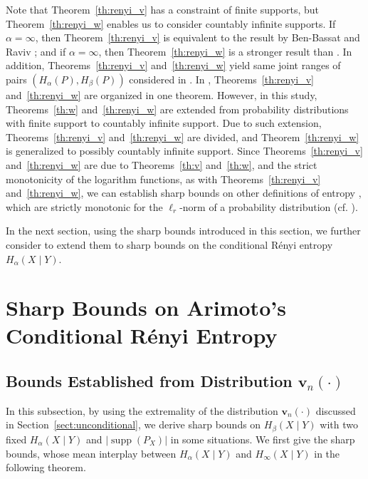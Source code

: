 \documentclass[conference, draftcls, onecolumn]{IEEEtran}
\theoremstyle{plain}
\newcommand{\bvec}[1]{\boldsymbol{#1}}
\newcommand{\supp}{\operatorname{supp}}
\newcommand{\thref}[1]{Theorem~\ref{#1}}
\newcommand{\sectref}[1]{Section~\ref{#1}}
\begin{document}
Note that \thref{th:renyi_v} has a constraint of finite supports, but \thref{th:renyi_w} enables us to consider countably infinite supports.
If $\alpha = \infty$, then \thref{th:renyi_v} is equivalent to the result by Ben-Bassat and Raviv \cite[Theorem~6]{ben-bassat};
and if $\alpha = \infty$, then \thref{th:renyi_w} is a stronger result than \cite[Theorems~4 and~5]{ben-bassat}.
In addition, Theorems~\ref{th:renyi_v} and~\ref{th:renyi_w} yield same joint ranges of pairs $(H_{\alpha}(P), H_{\beta}(P))$ considered in \cite{harremoes}.
In \cite[Theorem~2]{itw2016_reject}, Theorems~\ref{th:renyi_v} and~\ref{th:renyi_w} are organized in one theorem.
However, in this study, Theorems~\ref{th:w} and~\ref{th:renyi_w} are extended from probability distributions with finite support to countably infinite support.
Due to such extension, Theorems~\ref{th:renyi_v} and~\ref{th:renyi_w} are divided, and \thref{th:renyi_w} is generalized to possibly countably infinite support.
Since Theorems~\ref{th:renyi_v} and~\ref{th:renyi_w} are due to Theorems~\ref{th:v} and~\ref{th:w}, and the strict monotonicity of the logarithm functions, as with Theorems~\ref{th:renyi_v} and~\ref{th:renyi_w}, we can establish sharp bounds on other definitions of entropy \cite{behara, boekee, daroczy, havrda, tsallis2}, which are strictly monotonic for the $\ell_{r}$-norm of a probability distribution (cf. \cite[Table~I]{part1}).

In the next section, using the sharp bounds introduced in this section, we further consider to extend them to sharp bounds on the conditional R\'{e}nyi entropy $H_{\alpha}(X \mid Y)$.



\section{Sharp Bounds on Arimoto's Conditional R\'{e}nyi Entropy}
\label{sect:cond}


\subsection{Bounds Established from Distribution $\bvec{v}_{n}( \cdot )$}
\label{sect:v}



In this subsection, by using the extremality of the distribution $\bvec{v}_{n}( \cdot )$ discussed in \sectref{sect:unconditional}, we derive sharp bounds on $H_{\beta}(X \mid Y)$ with two fixed $H_{\alpha}(X \mid Y)$ and $|\!\supp( P_{X} )|$ in some situations.
We first give the sharp bounds, whose mean interplay between $H_{\alpha}(X \mid Y)$ and $H_{\infty}(X \mid Y)$ in the following theorem.
\end{document}
